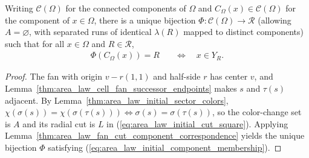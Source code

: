 \begin{lemma}
    \label{thm:area_law_initial_sector_components}
    \leanok
    Writing $\mathcal C(\Omega)$ for the connected components of $\Omega$ and $C_\Omega(x)\in\mathcal C(\Omega)$ for the component of $x\in\Omega$, there is a unique bijection $\Phi:\mathcal C(\Omega)\to\mathcal R$ (allowing $A=\varnothing$, with separated runs of identical $\lambda(R)$ mapped to distinct components) such that for all $x\in\Omega$ and $R\in\mathcal R$,
    \begin{align}
        \Phi(C_\Omega(x))=R
         & \quad\Longleftrightarrow\quad x\in Y_R.
        \label{eq:area_law_initial_component_membership}
    \end{align}
\end{lemma}
\begin{proof}\leanok
    The fan with origin $v-r(1,1)$ and half-side $r$ has center $v$, and Lemma~\ref{thm:area_law_cell_fan_successor_endpoints} makes $s$ and $\tau(s)$ adjacent.
    By Lemma~\ref{thm:area_law_initial_sector_colors}, $\chi(\sigma(s))=\chi(\sigma(\tau(s)))\iff\sigma(s)=\sigma(\tau(s))$, so the color-change set is $A$ and its radial cut is $L$ in (\ref{eq:area_law_initial_cut_square}).
    Applying Lemma~\ref{thm:area_law_fan_cut_component_correspondence} yields the unique bijection $\Phi$ satisfying (\ref{eq:area_law_initial_component_membership}).
\end{proof}


